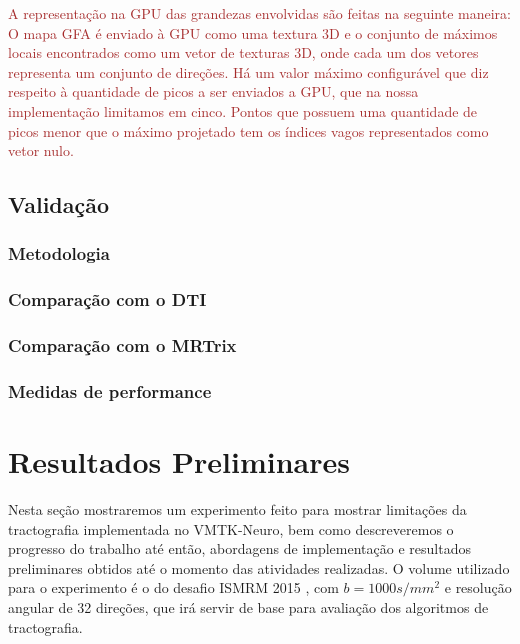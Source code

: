 \documentclass[
    12pt,                %
    oneside,            %
    a4paper,            %
    english,            %
    french,                %
    spanish,            %
    brazil                %
    ]{abntex2}
\begin{document}
\textcolor{brown}{
A representação na GPU das grandezas envolvidas são feitas na seguinte maneira: O mapa GFA é enviado à GPU como uma textura 3D e o conjunto de máximos locais encontrados como um vetor de texturas 3D, onde cada um dos vetores representa um conjunto de direções. Há um valor máximo configurável que diz respeito à quantidade de picos a ser enviados a GPU, que na nossa implementação limitamos em cinco. Pontos que possuem uma quantidade de picos menor que o máximo projetado tem os índices vagos representados como vetor nulo.
}


\section{Validação}

\subsection{Metodologia}

\subsection{Comparação com o DTI}

\subsection{Comparação com o MRTrix}

\subsection{Medidas de performance}




\pagebreak

\chapter{Resultados Preliminares}


Nesta seção mostraremos um experimento feito para mostrar limitações da tractografia implementada no VMTK-Neuro, bem como descreveremos o progresso do trabalho até então, abordagens de implementação e resultados preliminares obtidos até o momento das atividades realizadas. O volume utilizado para o experimento é o do desafio ISMRM 2015 \cite{TractometerTool}, com $b = 1000s/mm^2$ e resolução angular de 32 direções, que irá servir de base para avaliação dos algoritmos de tractografia.
\end{document}
